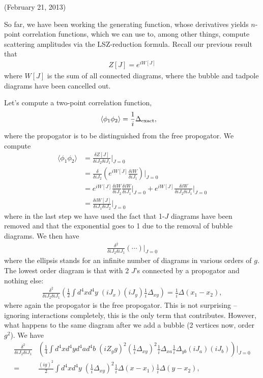 \documentclass{../mathnotes}
\begin{document}
(February 21, 2013)

So far, we have been working the generating function, whose derivatives yields $n$-point correlation functions, which we can use to, among other
things, compute scattering amplitudes via the LSZ-reduction formula. Recall our previous result that
\begin{align*}
    Z[J]=e^{iW[J]}
\end{align*}
where $W[J]$ is the sum of all connected diagrams, where the bubble and tadpole diagrams have been cancelled out.

Let's compute a two-point correlation function,
\begin{align*}
    \langle \phi_1\phi_2\rangle&=\frac{1}{i}\Delta_{\rm exact},
\end{align*}
where the propogator is to be distinguished from the free propogator. We compute
\begin{align*}
    \langle \phi_1 \phi_2 \rangle &= \frac{\delta Z[J]}{\delta iJ_2\delta iJ_1}\bigg|_{J=0}\\
    &= \frac{\delta}{\delta iJ_2}\left( e^{iW[J]}\frac{\delta iW}{\delta iJ_1} \right)\bigg|_{J=0}\\
    &= e^{iW[J]}\frac{\delta iW}{\delta iJ_2}\frac{\delta iW}{\delta iJ_1}\bigg|_{J=0}+e^{iW[J]}\frac{\delta iW}{\delta iJ_2\delta iJ_1}\bigg|_{J=0}\\
    &=\frac{\delta iW[J]}{\delta iJ_1\delta iJ_2}\bigg|_{J=0}
\end{align*}
where in the last step we have used the fact that 1-$J$ diagrams have been removed and that the exponential goes to 1 due to the removal of
bubble diagrams. We then have
\begin{align*}
    \frac{\delta^2}{\delta iJ_2\delta iJ_1}\left( \cdots \right)\bigg|_{J=0}
\end{align*}
where the ellipsis stands for an infinite number of diagrams in various orders of $g$. The lowest order diagram is that with 2 $J$'s connected
by a propogator and nothing else:
\begin{align*}
    \frac{\delta^2}{\delta iJ_2\delta iJ_1}\left(\frac{1}{2}\int d^4xd^4y\;(iJ_x)(iJ_y)\frac{1}{i}\Delta_{xy}\right)=\frac{1}{i}\Delta(x_1-x_2),
\end{align*}
where again the propogator is the free propogator. This is not surprising -- ignoring interactions completely, this is the only term that
contributes. However, what happens to the same diagram after we add a bubble (2 vertices now, order $g^2$). We have
\begin{align*}
    \frac{\delta^2}{\delta iJ_2\delta iJ_1}&\left( \frac{1}{4}\int d^4xd^4yd^4ad^4b\;(iZ_gg)^2\left(\frac{1}{i}\Delta_{xy}\right)^2\frac{1}{i}\Delta_{xa}\frac{1}{i}\Delta_{yb}(iJ_a)(iJ_b) \right)\bigg|_{J=0}\\
    =&\frac{(ig)^2}{2}\int d^4xd^4y\;\left( \frac{1}{i}\Delta_{xy} \right)^2\frac{1}{i}\Delta(x-x_1)\frac{1}{i}\Delta(y-x_2),
\end{align*}
\end{document}
